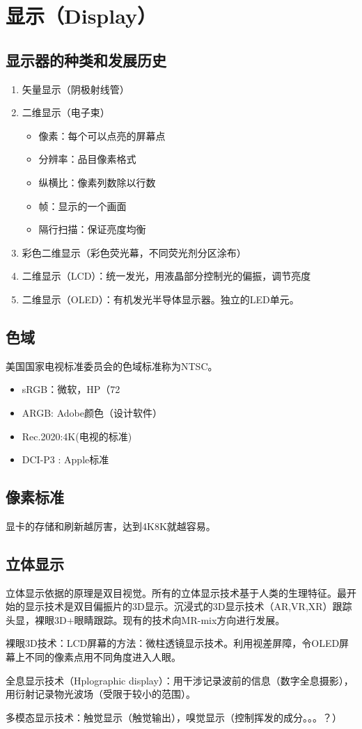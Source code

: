 \section{显示（Display）}

\subsection{显示器的种类和发展历史}

\begin{enumerate}
    \item 矢量显示（阴极射线管）
    \item 二维显示（电子束）
    \begin{itemize}
        \item 像素：每个可以点亮的屏幕点
        \item 分辨率：品目像素格式
        \item 纵横比：像素列数除以行数
        \item 帧：显示的一个画面
        \item 隔行扫描：保证亮度均衡
    \end{itemize}
    \item 彩色二维显示（彩色荧光幕，不同荧光剂分区涂布）
    \item 二维显示（LCD）：统一发光，用液晶部分控制光的偏振，调节亮度
    \item 二维显示（OLED）：有机发光半导体显示器。独立的LED单元。
\end{enumerate}

\subsection{色域}

美国国家电视标准委员会的色域标准称为NTSC。

\begin{itemize}
    \item sRGB：微软，HP（72%
    \item ARGB: Adobe颜色（设计软件）
    \item Rec.2020:4K(电视的标准)
    \item DCI-P3 : Apple标准
\end{itemize}

\subsection{像素标准}

显卡的存储和刷新越厉害，达到4K8K就越容易。

\subsection{立体显示}

立体显示依据的原理是双目视觉。所有的立体显示技术基于人类的生理特征。最开始的显示技术是双目偏振片的3D显示。沉浸式的3D显示技术（AR,VR,XR）跟踪头显，裸眼3D+眼睛跟踪。现有的技术向MR-mix方向进行发展。

裸眼3D技术：LCD屏幕的方法：微柱透镜显示技术。利用视差屏障，令OLED屏幕上不同的像素点用不同角度进入人眼。

全息显示技术（Hplographic display）：用干涉记录波前的信息（数字全息摄影），用衍射记录物光波场（受限于较小的范围）。

多模态显示技术：触觉显示（触觉输出），嗅觉显示（控制挥发的成分。。。？）

